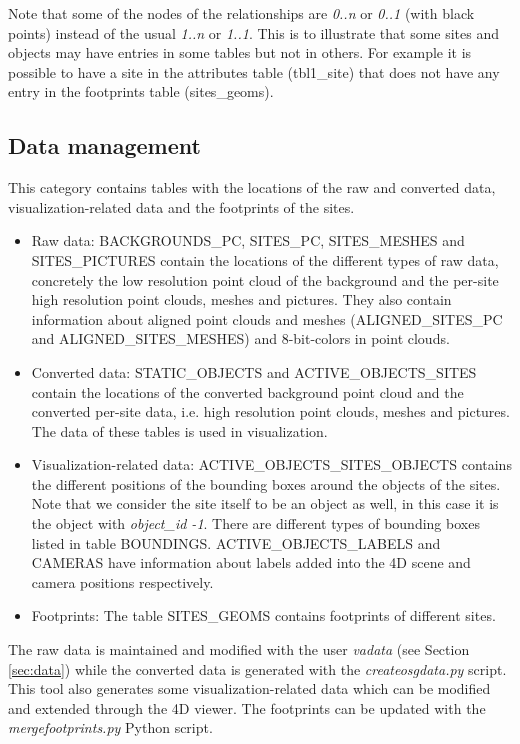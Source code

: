 \documentclass[a4paper,11pt]{article}
\begin{document}
Note that some of the nodes of the relationships are \textit{0..n} or \textit{0..1} (with black points) instead of the usual \textit{1..n} or \textit{1..1}. This is to illustrate that some sites and objects may have entries in some tables but not in others. For example it is possible to have a site in the attributes table (tbl1\_site) that does not have any entry in the footprints table (sites\_geoms).

\subsection{Data management}

This category contains tables with the locations of the raw and converted data, visualization-related data and the footprints of the sites.

\begin{itemize}
\item Raw data: BACKGROUNDS\_PC, SITES\_PC, SITES\_MESHES and SITES\_PICTURES contain the locations of the different types of raw data, concretely the low resolution point cloud of the background and the per-site high resolution point clouds, meshes and pictures. They also contain information about aligned point clouds and meshes (ALIGNED\_SITES\_PC and ALIGNED\_SITES\_MESHES) and 8-bit-colors in point clouds.

\item Converted data: STATIC\_OBJECTS and ACTIVE\_OBJECTS\_SITES contain the locations of the converted background point cloud and the converted per-site data, i.e. high resolution point clouds, meshes and pictures. The data of these tables is used in visualization.

\item Visualization-related data: ACTIVE\_OBJECTS\_SITES\_OBJECTS contains the different positions of the bounding boxes around the objects of the sites. Note that we consider the site itself to be an object as well, in this case it is the object with \textit{object\_id -1}. There are different types of bounding boxes listed in table BOUNDINGS. ACTIVE\_OBJECTS\_LABELS and CAMERAS have information about labels added into the 4D scene and camera positions respectively.

\item Footprints: The table SITES\_GEOMS contains footprints of different sites.
\end{itemize}

The raw data is maintained and modified with the user \textit{vadata} (see Section \ref{sec:data}) while the converted data is generated with the \textit{createosgdata.py} script. This tool also generates some visualization-related data which can be modified and extended through the 4D viewer. The footprints can be updated with the \textit{mergefootprints.py} Python script.
\end{document}
